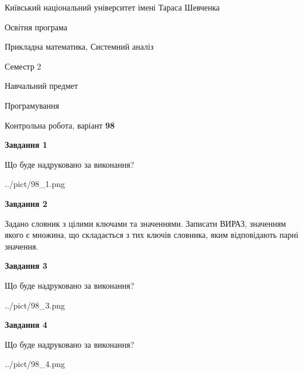\documentclass[12pt, ukrainian]{article}
\begin{document}
{{\begin {small}\par
{ \center  Київський національний університет імені Тараса Шевченка \par}
{\parbox {5 cm}{Освітня програма \hfill}{\parbox {8 cm}{Прикладна математика, Системний аналіз \hfill}}\parbox {5 cm}{\hfill Семестр 2}}\par
{\parbox {5 cm} {Навчальний предмет \hfill}\parbox {7 cm}{Програмування \hfill}\parbox {6cm}{\hfill}\par}\vspace{-7pt} \end{small}}{\center Контрольна робота, варіант  \No \textbf
{ 98 }\par}}
{
\begin {large}
{\begin {center}\textbf{Завдання 1}\end {center}}\par
Що буде надруковано за виконання?\par\par
\begin{center}
	{../pict/98_1.png}
\end{center}
\newpage

{\begin {center}\textbf{Завдання 2}\end {center}}\par
Задано словник  з цілими ключами та значеннями. Записати ВИРАЗ, значенням якого є множина, що складається  з тих ключів словника, яким відповідають парні значення.\par
\newpage

{\begin {center}\textbf{Завдання 3}\end {center}}\par
Що буде надруковано за виконання?\par
\begin{center}
	{../pict/98_3.png}
\end{center}
\newpage

{\begin {center}\textbf{Завдання 4}\end {center}}\par
Що буде надруковано за виконання?\par
\begin{center}
	{../pict/98_4.png}
\end{center}
\newpage


\end{large}}
\end{document}
